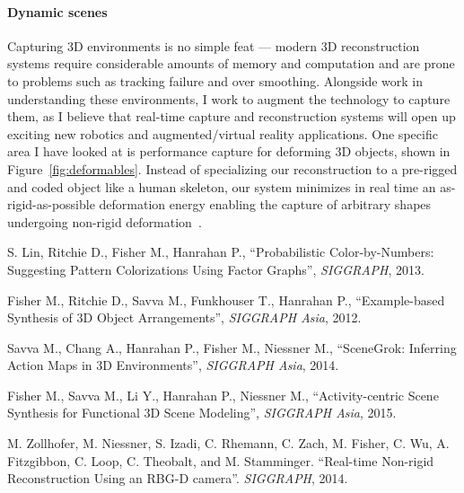 \documentclass[12pt, a4paper]{article}
\begin{document}
\begin{small}
\paragraph{Dynamic scenes} Capturing 3D environments is no simple feat --- modern 3D reconstruction systems require considerable amounts of memory and computation and are prone to problems such as tracking failure and over smoothing. Alongside work in understanding these environments, I work to augment the technology to capture them, as I believe that real-time capture and reconstruction systems will open up exciting new robotics and augmented/virtual reality applications. One specific area I have looked at is performance capture for deforming 3D objects, shown in Figure~\ref{fig:deformables}. Instead of specializing our reconstruction to a pre-rigged and coded object like a human skeleton, our system minimizes in real time an as-rigid-as-possible deformation energy enabling the capture of arbitrary shapes undergoing non-rigid deformation~\cite{deformables}.

\vspace{0.5cm}

\end{small}

\begin{footnotesize}

\begin{thebibliography}{}


S. Lin, Ritchie D., Fisher M., Hanrahan P., ``Probabilistic Color-by-Numbers: Suggesting Pattern Colorizations
Using Factor Graphs'', {\it SIGGRAPH}, 2013.

Fisher M., Ritchie D., Savva M., Funkhouser T., Hanrahan P., ``Example-based Synthesis of 3D Object Arrangements'', {\it SIGGRAPH Asia}, 2012.

Savva M., Chang A., Hanrahan P., Fisher M., Niessner M., ``SceneGrok: Inferring Action Maps in 3D Environments'', {\it SIGGRAPH Asia}, 2014.

Fisher M., Savva M., Li Y., Hanrahan P., Niessner M., ``Activity-centric Scene Synthesis for Functional 3D Scene Modeling'', {\it SIGGRAPH Asia}, 2015.

M. Zollhofer, M. Niessner, S. Izadi, C. Rhemann, C. Zach, M. Fisher, C. Wu, A. Fitzgibbon, C. Loop,
C. Theobalt, and M. Stamminger. ``Real-time Non-rigid Reconstruction Using an RBG-D camera''. {\it SIGGRAPH}, 2014.

\end{thebibliography}
\end{footnotesize}
\end{document}
